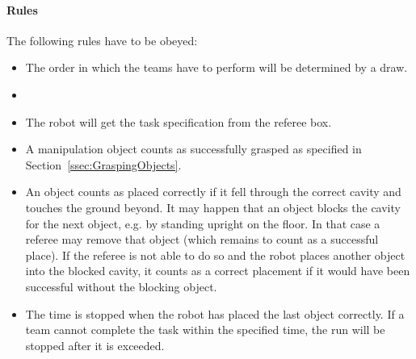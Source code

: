 \paragraph{Rules}
The following rules have to be obeyed:

\begin{itemize}

\item The order in which the teams have to perform will be determined by a draw.
\item {}
\item The robot will get the task specification from the referee box.
\item A manipulation object counts as successfully grasped as specified in Section~\ref{ssec:GraspingObjects}.
\item An object counts as placed correctly if it fell through the correct cavity and touches the ground beyond. It may happen that an object blocks the cavity for the next object, e.g. by standing upright on the floor. In that case a referee may remove that object (which remains to count as a successful place). If the referee is not able to do so and the robot places another object into the blocked cavity, it counts as a correct placement if it would have been successful without the blocking object.
\item The time is stopped when the robot has placed the last object correctly. If a team cannot complete the task within the specified time, the run will be stopped after it is exceeded.  

\end{itemize}

%


